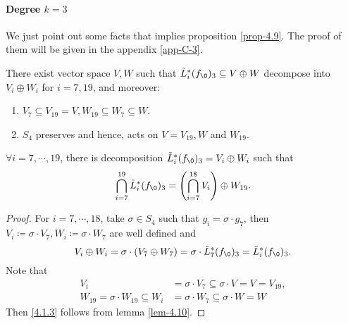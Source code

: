 \paragraph{Degree \texorpdfstring{$k=3$}{k=3}}
We just point out some facts that implies proposition \ref{prop-4.9}. The proof of them will be given in the appendix \ref{app-C-3}.
\begin{fact}\label{fac-4.11}
  There exist vector space $V,W$ such that $\tilde L^*_i(f_\0)_3\subseteq V\oplus W$ decompose into $V_i\oplus W_i$ for $i=7,19$, and moreover:
  \begin{enumerate}
\item $V_7\subseteq V_{19}= V, W_{19}\subseteq W_7\subseteq W$.
\item $S_4$ preserves and hence, acts on $V=V_{19},W$ and $W_{19}$. 
\end{enumerate}
\end{fact}
\begin{corollary}\label{cor-4.12}
  $\forall i=7,\cdots, 19$, there is decomposition $\tilde L^*_i(f_\0)_3 = V_i\oplus W_i$ such that 
  \begin{equation}\label{4.1.3}
    \bigcap_{i=7}^{19} \tilde L_i^* (f_\0)_3 = \left( \bigcap_{i=7}^{18} V_i\right) \oplus W_{19}.
  \end{equation}
\end{corollary}
\begin{proof}
  For $i=7,\cdots, 18$, take $\sigma\in S_4$ such that $g_i=\sigma \cdot g_7$, then $V_i\coloneq \sigma \cdot V_7,W_i\coloneq \sigma \cdot W_7$
  are well defined and 
  \[V_i\oplus W_i = \sigma\cdot( V_7\oplus W_7) = \sigma \cdot \tilde L ^*_7(f_\0)_3 = \tilde L ^*_i(f_\0)_3.\]
  Note that
  \begin{align*}
    V_i&=\sigma \cdot V_7\subseteq \sigma \cdot V=V=V_{19},\\
    W_{19}=\sigma \cdot W_{19}\subseteq  W_i&=\sigma \cdot W_7\subseteq \sigma \cdot W=W
  \end{align*}
  Then \eqref{4.1.3} follows from lemma \ref{lem-4.10}.
\end{proof}

